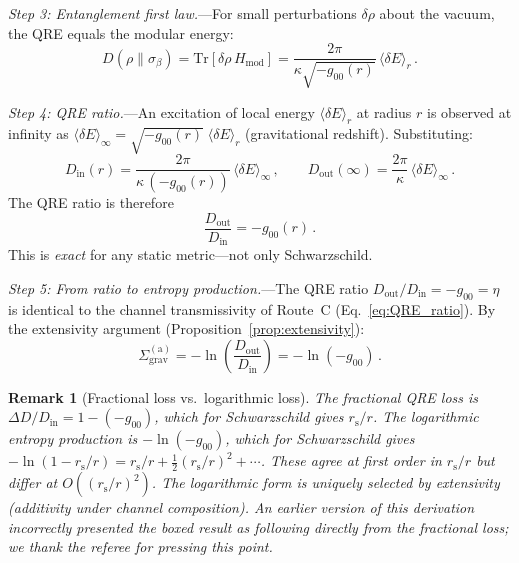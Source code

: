 \documentclass[aps,prd,preprint,superscriptaddress,longbibliography]{revtex4-2}
\newtheorem*{remark}{Remark}
\newcommand{\Tr}{\mathrm{Tr}}
\newcommand{\rs}{r_{\mathrm{s}}}
\newcommand{\Sgrav}{\Sigma_{\mathrm{grav}}}
\begin{document}
\emph{Step 3: Entanglement first law.}---For small perturbations
$\delta\rho$ about the vacuum, the QRE equals the modular energy:
\begin{equation}
  D(\rho\|\sigma_\beta)
  = \Tr[\delta\rho\,H_{\mathrm{mod}}]
  = \frac{2\pi}{\kappa\sqrt{-g_{00}(r)}}\,\langle\delta E\rangle_r\,.
  \label{eq:first_law}
\end{equation}

\emph{Step 4: QRE ratio.}---An excitation of local energy
$\langle\delta E\rangle_r$ at radius $r$ is observed at infinity as
$\langle\delta E\rangle_\infty = \sqrt{-g_{00}(r)}\;
\langle\delta E\rangle_r$ (gravitational redshift).
Substituting:
\begin{equation}
  D_{\mathrm{in}}(r)
  = \frac{2\pi}{\kappa\,(-g_{00}(r))}\,\langle\delta E\rangle_\infty\,,
  \qquad
  D_{\mathrm{out}}(\infty) = \frac{2\pi}{\kappa}\,\langle\delta E\rangle_\infty\,.
  \label{eq:Din_Dout}
\end{equation}
The QRE ratio is therefore
\begin{equation}
  \frac{D_{\mathrm{out}}}{D_{\mathrm{in}}} = -g_{00}(r)\,.
  \label{eq:QRE_ratio_A}
\end{equation}
This is \emph{exact} for any static metric---not only Schwarzschild.

\emph{Step 5: From ratio to entropy production.}---The QRE ratio
$D_{\mathrm{out}}/D_{\mathrm{in}} = -g_{00} = \eta$ is identical
to the channel transmissivity of Route~C
(Eq.~\eqref{eq:QRE_ratio}).  By the extensivity argument
(Proposition~\ref{prop:extensivity}):
\begin{equation}
  \boxed{\Sgrav^{(\mathrm{a})} = -\ln\!\left(\frac{D_{\mathrm{out}}}{D_{\mathrm{in}}}\right)
  = -\ln(-g_{00})\,.}
  \label{eq:route_a_result}
\end{equation}

\begin{remark}[Fractional loss vs.\ logarithmic loss]
The \emph{fractional} QRE loss is
$\Delta D/D_{\mathrm{in}} = 1 - (-g_{00})$, which for
Schwarzschild gives $\rs/r$.  The \emph{logarithmic} entropy
production is $-\ln(-g_{00})$, which for Schwarzschild gives
$-\ln(1 - \rs/r) = \rs/r + \tfrac{1}{2}(\rs/r)^2 + \cdots$.
These agree at first order in $\rs/r$ but differ at
$O((\rs/r)^2)$.  The logarithmic form is uniquely selected by
extensivity (additivity under channel composition).  An earlier
version of this derivation incorrectly presented the boxed
result as following directly from the fractional loss;
we thank the referee for pressing this point.
\end{remark}
\end{document}
